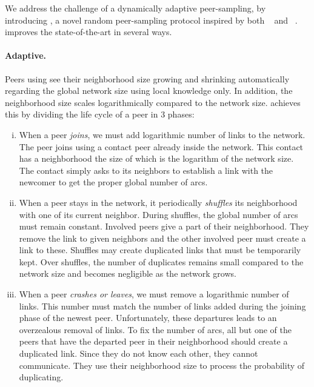 We address the challenge of a dynamically adaptive peer-sampling,
by introducing \SPRAY, a novel random peer-sampling protocol inspired by both
\SCAMP~\cite{ganesh2001scamp,ganesh2003peer} and
\CYCLON~\cite{voulgaris2005cyclon}. \SPRAY improves the state-of-the-art in
several ways.

\paragraph{Adaptive.}
Peers using \SPRAY see their neighborhood size growing and shrinking
automatically regarding the global network size using local knowledge only. In
addition, the neighborhood size scales logarithmically compared to the network
size. \SPRAY achieves this by dividing the life cycle of a peer in 3 phases: 
\begin{enumerate}[(i)]
\item When a peer \emph{joins}, we must add logarithmic number of links to the
  network. The peer joins using a contact peer already inside the network. This
  contact has a neighborhood the size of which is the logarithm of the network
  size. The contact simply asks to its neighbors to establish a link with the
  newcomer to get the proper global number of arcs.
\item When a peer stays in the network, it periodically \emph{shuffles} its
  neighborhood with one of its current neighbor. During shuffles, the global
  number of arcs must remain constant. Involved peers give a part of their
  neighborhood. They remove the link to given neighbors and the other involved
  peer must create a link to these. Shuffles may create duplicated links that
  must be temporarily kept.  Over shuffles, the number of duplicates remains
  small compared to the network size and becomes negligible as the network
  grows.
\item When a peer \emph{crashes or leaves}, we must remove a logarithmic number
  of links. This number must match the number of links added during the joining
  phase of the newest peer. Unfortunately, these departures leads to an
  overzealous removal of links. To fix the number of arcs, all but one of the
  peers that have the departed peer in their neighborhood should create a
  duplicated link. Since they do not know each other, they cannot
  communicate. They use their neighborhood size to process the probability of
  duplicating.
\end{enumerate}


